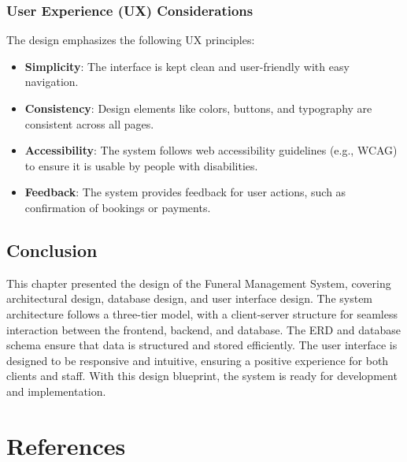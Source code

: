 \documentclass[a4paper,12pt]{report}
\begin{document}
\subsection{User Experience (UX) Considerations}
The design emphasizes the following UX principles:
\begin{itemize}
    \item \textbf{Simplicity}: The interface is kept clean and user-friendly with easy navigation.
    \item \textbf{Consistency}: Design elements like colors, buttons, and typography are consistent across all pages.
    \item \textbf{Accessibility}: The system follows web accessibility guidelines (e.g., WCAG) to ensure it is usable by people with disabilities.
    \item \textbf{Feedback}: The system provides feedback for user actions, such as confirmation of bookings or payments.
\end{itemize}

\section{Conclusion}
This chapter presented the design of the Funeral Management System, covering architectural design, database design, and user interface design. The system architecture follows a three-tier model, with a client-server structure for seamless interaction between the frontend, backend, and database. The ERD and database schema ensure that data is structured and stored efficiently. The user interface is designed to be responsive and intuitive, ensuring a positive experience for both clients and staff. With this design blueprint, the system is ready for development and implementation.

\newpage
\chapter*{References}
\end{document}
